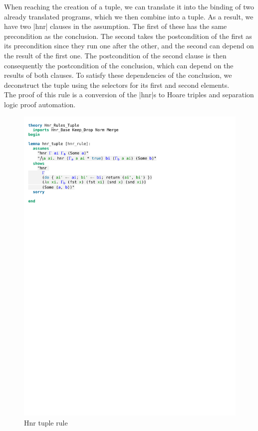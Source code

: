 When reaching the creation of a tuple, we can translate it into the binding of two already translated programs, which we then combine into a tuple. As a result, we have two |hnr| clauses in the assumption. The first of these has the same precondition as the conclusion. The second takes the postcondition of the first as its precondition since they run one after the other, and the second can depend on the result of the first one. The postcondition of the second clause is then consequently the postcondition of the conclusion, which can depend on the results of both clauses. To satisfy these dependencies of the conclusion, we deconstruct the tuple using the selectors for its first and second elements. \\
The proof of this rule is a conversion of the |hnr|s to Hoare triples and separation logic proof automation.

\begin{figure}[htpb]
    \includegraphics[trim={0 22,4cm 0 2,4cm}, clip, width=1.00\textwidth]{figures/Theory_Hnr_Rules_Tuple.pdf}
    \caption[Hnr tuple rule]{Hnr tuple rule}
    \label{fig:hnr_tuple}
\end{figure}


